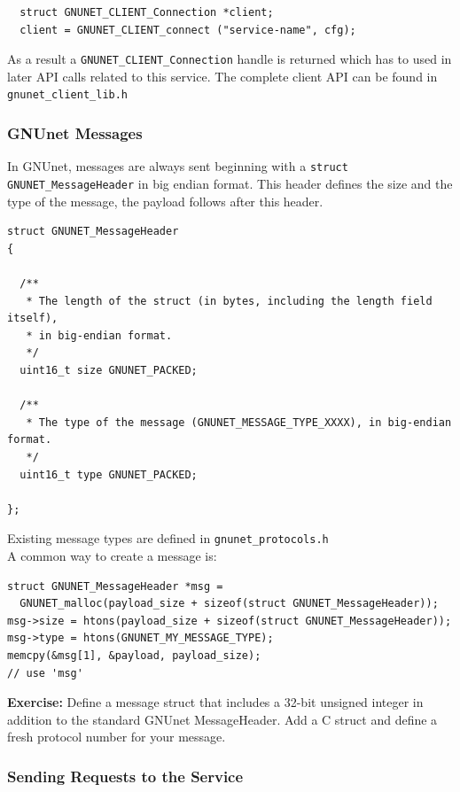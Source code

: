 \documentclass[10pt]{article}
\newcommand{\exercise}[1]{\noindent\begin{boxedminipage}{\textwidth}{\bf Exercise:} #1 \end{boxedminipage}}
\begin{document}
\lstset{language=c}
\begin{lstlisting}
  struct GNUNET_CLIENT_Connection *client;
  client = GNUNET_CLIENT_connect ("service-name", cfg);
\end{lstlisting}

As a result a {\tt GNUNET\_CLIENT\_Connection} handle is returned 
which has to used in later API calls related to this service.
The complete client API can be found in {\tt gnunet\_client\_lib.h}

\subsubsection{GNUnet Messages}

In GNUnet, messages are always sent beginning with a {\tt struct GNUNET\_MessageHeader}
in big endian format. This header defines the size and the type of the 
message, the payload follows after this header.

\lstset{language=c}
\begin{lstlisting}
struct GNUNET_MessageHeader
{

  /**
   * The length of the struct (in bytes, including the length field itself),
   * in big-endian format.
   */
  uint16_t size GNUNET_PACKED;

  /**
   * The type of the message (GNUNET_MESSAGE_TYPE_XXXX), in big-endian format.
   */
  uint16_t type GNUNET_PACKED;

};
\end{lstlisting}

Existing message types are defined in {\tt gnunet\_protocols.h}\\
A common way to create a message is:

\lstset{language=c}
\begin{lstlisting}
struct GNUNET_MessageHeader *msg = 
  GNUNET_malloc(payload_size + sizeof(struct GNUNET_MessageHeader));
msg->size = htons(payload_size + sizeof(struct GNUNET_MessageHeader));
msg->type = htons(GNUNET_MY_MESSAGE_TYPE);
memcpy(&msg[1], &payload, payload_size);
// use 'msg'
\end{lstlisting}

\exercise{Define a message struct that includes a 32-bit
unsigned integer in addition to the standard GNUnet MessageHeader.
Add a C struct and define a fresh protocol number for your message.}


\subsubsection{Sending Requests to the Service}
\end{document}
